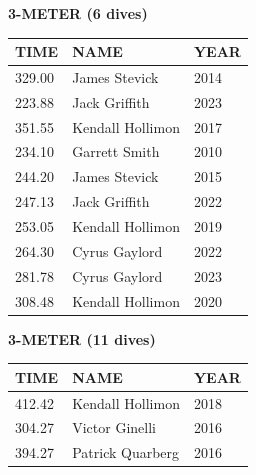 \begin{table}[H]
\centering
\begin{minipage}[t]{0.6\textwidth}
\centering
\textbf{3-METER (6 dives)}\\[0.1cm]
\begin{tabular}{@{}p{1.8cm}p{2.8cm}p{1.2cm}@{}}
\hline
    \textbf{TIME} & \textbf{NAME} & \textbf{YEAR} \\
\hline
    329.00 & James Stevick & 2014 \\
    223.88 & Jack Griffith & 2023 \\
    351.55 & Kendall Hollimon & 2017 \\
    234.10 & Garrett Smith & 2010 \\
    244.20 & James Stevick & 2015 \\
    247.13 & Jack Griffith & 2022 \\
    253.05 & Kendall Hollimon & 2019 \\
    264.30 & Cyrus Gaylord & 2022 \\
    281.78 & Cyrus Gaylord & 2023 \\
    308.48 & Kendall Hollimon & 2020 \\
\hline
\end{tabular}
\end{minipage}
\end{table}

\begin{table}[H]
\centering
\begin{minipage}[t]{0.6\textwidth}
\centering
\textbf{3-METER (11 dives)}\\[0.1cm]
\begin{tabular}{@{}p{1.8cm}p{2.8cm}p{1.2cm}@{}}
\hline
    \textbf{TIME} & \textbf{NAME} & \textbf{YEAR} \\
\hline
    412.42 & Kendall Hollimon & 2018 \\
    304.27 & Victor Ginelli & 2016 \\
    394.27 & Patrick Quarberg & 2016 \\
\hline
\end{tabular}
\end{minipage}
\end{table}

